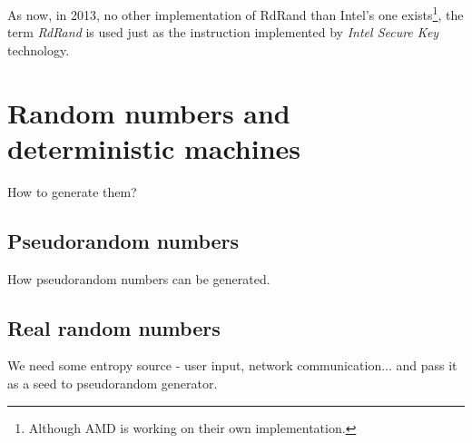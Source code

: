 As now, in 2013, no other implementation of RdRand than Intel's one exists\footnote{Although AMD is working on their own implementation.},%
the term {\em RdRand} is used just as the instruction implemented by {\em Intel Secure Key} technology.


\chapter{Random numbers and deterministic machines}
How to generate them?
\section{Pseudorandom numbers}
How pseudorandom numbers can be generated.

\section{Real random numbers}
We need some entropy source - user input, network communication... and pass it as a seed to pseudorandom generator.
